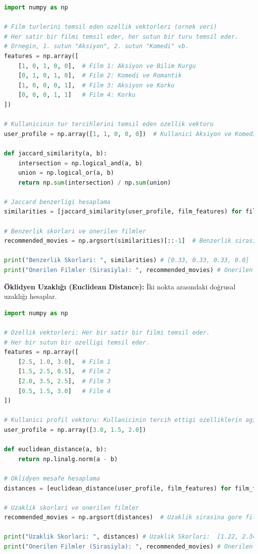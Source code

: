 \begin{lstlisting}[language=Python]
import numpy as np

# Film turlerini temsil eden ozellik vektorleri (ornek veri)
# Her satir bir filmi temsil eder, her sutun bir turu temsil eder.
# Ornegin, 1. sutun "Aksiyon", 2. sutun "Komedi" vb.
features = np.array([
    [1, 0, 1, 0, 0],  # Film 1: Aksiyon ve Bilim Kurgu
    [0, 1, 0, 1, 0],  # Film 2: Komedi ve Romantik
    [1, 0, 0, 0, 1],  # Film 3: Aksiyon ve Korku
    [0, 0, 0, 1, 1]   # Film 4: Korku
])

# Kullanicinin tur tercihlerini temsil eden ozellik vektoru
user_profile = np.array([1, 1, 0, 0, 0])  # Kullanici Aksiyon ve Komedi filmlerini sever.

def jaccard_similarity(a, b):
    intersection = np.logical_and(a, b)
    union = np.logical_or(a, b)
    return np.sum(intersection) / np.sum(union)

# Jaccard benzerligi hesaplama
similarities = [jaccard_similarity(user_profile, film_features) for film_features in features]

# Benzerlik skorlari ve onerilen filmler
recommended_movies = np.argsort(similarities)[::-1]  # Benzerlik sirasina gore filmleri sirala

print("Benzerlik Skorlari: ", similarities) # [0.33, 0.33, 0.33, 0.0]
print("Onerilen Filmler (Sirasiyla): ", recommended_movies) # Onerilen Filmler (Sirasiyla):  [2 1 0 3]
\end{lstlisting}

\textbf{Öklidyen Uzaklığı (Euclidean Distance):} İki nokta arasındaki doğrusal uzaklığı hesaplar.

\begin{lstlisting}[language=Python]
import numpy as np

# Ozellik vektorleri: Her bir satir bir filmi temsil eder.
# Her bir sutun bir ozelligi temsil eder.
features = np.array([
    [2.5, 1.0, 3.0],  # Film 1
    [1.5, 2.5, 0.5],  # Film 2
    [2.0, 3.5, 2.5],  # Film 3
    [0.5, 1.5, 3.0]   # Film 4
])

# Kullanici profil vektoru: Kullanicinin tercih ettigi ozelliklerin agirliklarini icerir.
user_profile = np.array([3.0, 1.5, 2.0])

def euclidean_distance(a, b):
    return np.linalg.norm(a - b)

# Oklidyen mesafe hesaplama
distances = [euclidean_distance(user_profile, film_features) for film_features in features]

# Uzaklik skorlari ve onerilen filmler
recommended_movies = np.argsort(distances)  # Uzaklik sirasina gore filmleri sirala

print("Uzaklik Skorlari: ", distances) # Uzaklik Skorlari:  [1.22, 2.34, 2.29, 2.69]
print("Onerilen Filmler (Sirasiyla): ", recommended_movies) # Onerilen Filmler (Sirasiyla):  [0 2 1 3]
\end{lstlisting}

